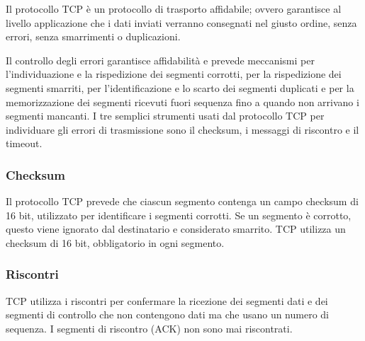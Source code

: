Il protocollo TCP è un protocollo di trasporto affidabile; ovvero garantisce al livello applicazione che i dati inviati verranno consegnati nel giusto ordine, senza errori, senza smarrimenti o duplicazioni.

Il controllo degli errori garantisce affidabilità e prevede meccanismi per l'individuazione e la rispedizione dei segmenti corrotti, per la rispedizione dei segmenti smarriti, per l'identificazione e lo scarto dei segmenti duplicati e per la memorizzazione dei segmenti ricevuti fuori sequenza fino a quando non arrivano i segmenti mancanti. I tre semplici strumenti usati dal protocollo TCP per individuare gli errori di trasmissione sono il checksum, i messaggi di riscontro e il timeout.

\subsubsection{Checksum}
Il protocollo TCP prevede che ciascun segmento contenga un campo checksum di 16 bit, utilizzato per identificare i segmenti corrotti. Se un segmento è corrotto, questo viene ignorato dal destinatario e considerato smarrito. TCP utilizza un checksum di 16 bit, obbligatorio in ogni segmento.

\subsubsection{Riscontri}
TCP utilizza i riscontri per confermare la ricezione dei segmenti dati e dei segmenti di controllo che non contengono dati ma che usano un numero di sequenza. I segmenti di riscontro (ACK) non sono mai riscontrati.


